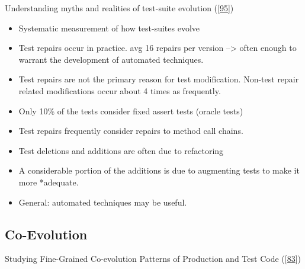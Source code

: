 \documentclass[]{book}
\providecommand{\tightlist}{%
  \setlength{\itemsep}{0pt}\setlength{\parskip}{0pt}}
\begin{document}
Understanding myths and realities of test-suite evolution
({[}\protect\hyperlink{ref-pinto2012understanding}{95}{]})

\begin{itemize}
\tightlist
\item
  Systematic measurement of how test-suites evolve
\item
  Test repairs occur in practice. avg 16 repairs per version
  --\textgreater{} often enough to warrant the development of automated
  techniques.
\item
  Test repairs are not the primary reason for test modification.
  Non-test repair related modifications occur about 4 times as
  frequently.
\item
  Only 10\% of the tests consider fixed assert tests (oracle tests)
\item
  Test repairs frequently consider repairs to method call chains.
\item
  Test deletions and additions are often due to refactoring
\item
  A considerable portion of the additions is due to augmenting tests to
  make it more *adequate.
\item
  General: automated techniques may be useful.
\end{itemize}

\subsection{Co-Evolution}\label{co-evolution}

Studying Fine-Grained Co-evolution Patterns of Production and Test Code
({[}\protect\hyperlink{ref-marsavina2014}{83}{]})
\end{document}
